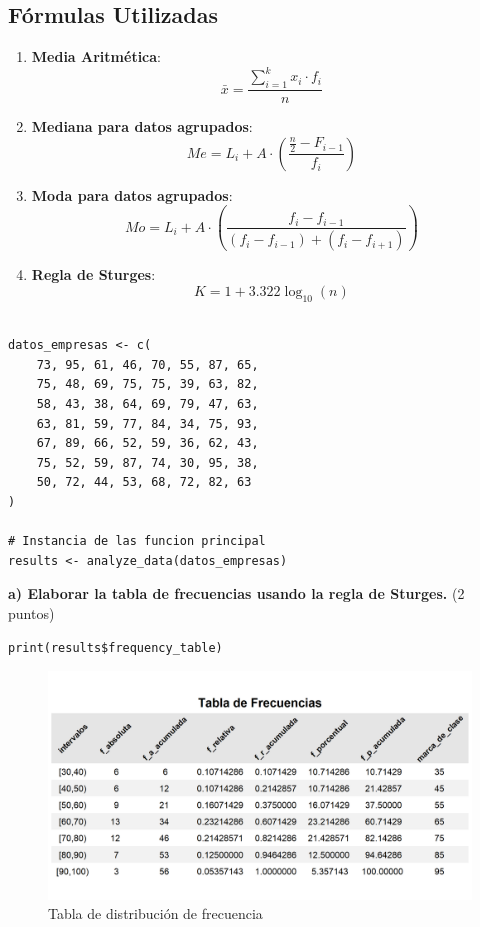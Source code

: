 \documentclass[12pt, a4paper]{article}
\begin{document}
\subsection{Fórmulas Utilizadas}

\begin{enumerate}
    \item \textbf{Media Aritmética}:
    \[ \bar{x} = \frac{\sum_{i=1}^{k} x_i \cdot f_i}{n} \]
    
    \item \textbf{Mediana para datos agrupados}:
    \[ Me = L_i + A \cdot \left(\frac{\frac{n}{2} - F_{i-1}}{f_i}\right) \]
    
    \item \textbf{Moda para datos agrupados}:
    \[Mo = L_i + A \cdot \left(\frac{f_i - f_{i-1}}{(f_i - f_{i-1}) + (f_i - f_{i+1})}\right)\]

    \item \textbf{Regla de Sturges}:
    \[ K = 1 + 3.322 \log_{10}(n) \]
\end{enumerate}

\begin{lstlisting}[caption=Numero de trabajadores encuestados por empresa]

datos_empresas <- c(
    73, 95, 61, 46, 70, 55, 87, 65,
    75, 48, 69, 75, 75, 39, 63, 82,
    58, 43, 38, 64, 69, 79, 47, 63,
    63, 81, 59, 77, 84, 34, 75, 93,
    67, 89, 66, 52, 59, 36, 62, 43,
    75, 52, 59, 87, 74, 30, 95, 38,
    50, 72, 44, 53, 68, 72, 82, 63
)

# Instancia de las funcion principal
results <- analyze_data(datos_empresas)
\end{lstlisting}

\textbf{a) Elaborar la tabla de frecuencias usando la regla de Sturges.} (2 puntos)

\begin{lstlisting}[caption=Mostrar tabla de frecuencia]
print(results$frequency_table)
\end{lstlisting}

\begin{figure}[ht!]  %
    \centering
    \includegraphics[width=1\textwidth]{Tabla de Distribucion de frecuencia.png}  %
    \caption{Tabla de distribución de frecuencia}  %
    \label{fig:ejemplo}  %
\end{figure}
\end{document}
